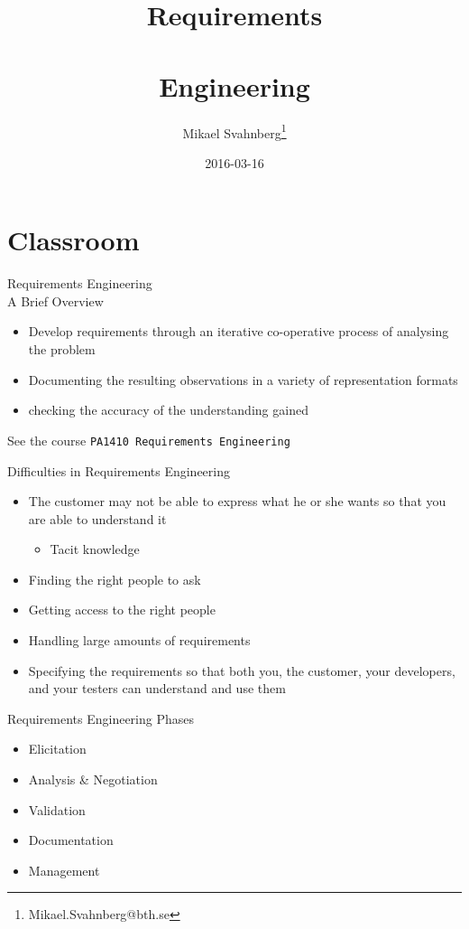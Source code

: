 \documentclass[10pt,t,a4paper]{beamer}
\author{Mikael Svahnberg\thanks{Mikael.Svahnberg@bth.se}}
\date{2016-03-16}
\title{Requirements \\\\ Engineering}
\begin{document}
\maketitle

\section{Classroom}
\label{sec-1}
\begin{frame}[fragile,label=sec-1-1]{Requirements Engineering \\ A Brief Overview}
 \begin{itemize}
\item Develop requirements through an iterative co-operative process of analysing the problem
\item Documenting the resulting observations in a variety of representation formats
\item checking the accuracy of the understanding gained
\end{itemize}

See the course \verb~PA1410 Requirements Engineering~
\end{frame}
\begin{frame}[label=sec-1-2]{Difficulties in Requirements Engineering}
\begin{itemize}
\item The customer may not be able to express what he or she wants so that you are able to understand it
\begin{itemize}
\item Tacit knowledge
\end{itemize}
\item Finding the right people to ask
\item Getting access to the right people
\item Handling large amounts of requirements
\item Specifying the requirements so that both you, the customer, your developers, and your testers can understand and use them
\end{itemize}
\end{frame}
\begin{frame}[label=sec-1-3]{Requirements Engineering Phases}
\begin{itemize}
\item Elicitation
\item Analysis \& Negotiation
\item Validation
\item Documentation
\item Management
\end{itemize}
\end{frame}
\end{document}
